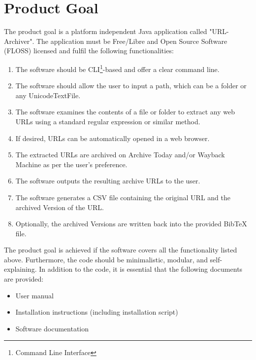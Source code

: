 \section{Product Goal}
The product goal  is a platform independent Java application called "URL-Archiver".
The application must be Free/Libre and Open Source Software (\gls{FLOSS}) licensed and fulfil the following functionalities:
\begin{enumerate}
    \item The software should be \gls{CLI}\footnote{Command Line Interface}-based and offer a clear command line.
    \item The software should allow the user to input a path, which can be a folder or any \gls{UnicodeTextFile}.
    \item The software examines the contents of a file or folder to extract any web URLs using a standard regular expression or similar method.
    \item If desired, URLs can be automatically opened in a web browser.
    \item The extracted URLs are archived on Archive Today and/or Wayback Machine as per the user's preference.
    \item The software outputs the resulting archive URLs to the user.
    \item The software generates a CSV file containing the original URL and the archived Version of the URL.
    \item Optionally, the archived Versions are written back into the provided BibTeX file.
\end{enumerate}
The product goal is achieved if the software covers all the functionality listed above.
Furthermore, the code should be minimalistic, modular, and self-explaining.
In addition to the code, it is essential that the following documents are provided:
\begin{itemize}
    \item User manual
    \item Installation instructions (including installation script)
    \item Software documentation
\end{itemize}
\clearpage

